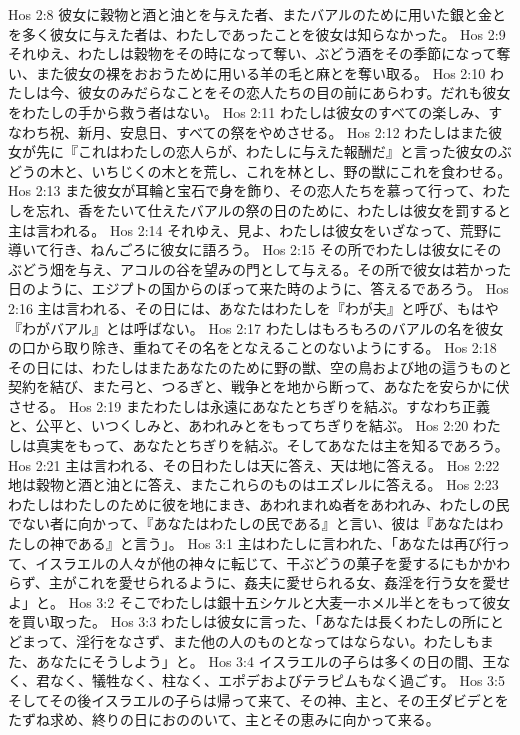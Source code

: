 Hos 2:8  彼女に穀物と酒と油とを与えた者、またバアルのために用いた銀と金とを多く彼女に与えた者は、わたしであったことを彼女は知らなかった。
Hos 2:9  それゆえ、わたしは穀物をその時になって奪い、ぶどう酒をその季節になって奪い、また彼女の裸をおおうために用いる羊の毛と麻とを奪い取る。
Hos 2:10  わたしは今、彼女のみだらなことをその恋人たちの目の前にあらわす。だれも彼女をわたしの手から救う者はない。
Hos 2:11  わたしは彼女のすべての楽しみ、すなわち祝、新月、安息日、すべての祭をやめさせる。
Hos 2:12  わたしはまた彼女が先に『これはわたしの恋人らが、わたしに与えた報酬だ』と言った彼女のぶどうの木と、いちじくの木とを荒し、これを林とし、野の獣にこれを食わせる。
Hos 2:13  また彼女が耳輪と宝石で身を飾り、その恋人たちを慕って行って、わたしを忘れ、香をたいて仕えたバアルの祭の日のために、わたしは彼女を罰すると主は言われる。
Hos 2:14  それゆえ、見よ、わたしは彼女をいざなって、荒野に導いて行き、ねんごろに彼女に語ろう。
Hos 2:15  その所でわたしは彼女にそのぶどう畑を与え、アコルの谷を望みの門として与える。その所で彼女は若かった日のように、エジプトの国からのぼって来た時のように、答えるであろう。
Hos 2:16  主は言われる、その日には、あなたはわたしを『わが夫』と呼び、もはや『わがバアル』とは呼ばない。
Hos 2:17  わたしはもろもろのバアルの名を彼女の口から取り除き、重ねてその名をとなえることのないようにする。
Hos 2:18  その日には、わたしはまたあなたのために野の獣、空の鳥および地の這うものと契約を結び、また弓と、つるぎと、戦争とを地から断って、あなたを安らかに伏させる。
Hos 2:19  またわたしは永遠にあなたとちぎりを結ぶ。すなわち正義と、公平と、いつくしみと、あわれみとをもってちぎりを結ぶ。
Hos 2:20  わたしは真実をもって、あなたとちぎりを結ぶ。そしてあなたは主を知るであろう。
Hos 2:21  主は言われる、その日わたしは天に答え、天は地に答える。
Hos 2:22  地は穀物と酒と油とに答え、またこれらのものはエズレルに答える。
Hos 2:23  わたしはわたしのために彼を地にまき、あわれまれぬ者をあわれみ、わたしの民でない者に向かって、『あなたはわたしの民である』と言い、彼は『あなたはわたしの神である』と言う」。
Hos 3:1  主はわたしに言われた、「あなたは再び行って、イスラエルの人々が他の神々に転じて、干ぶどうの菓子を愛するにもかかわらず、主がこれを愛せられるように、姦夫に愛せられる女、姦淫を行う女を愛せよ」と。
Hos 3:2  そこでわたしは銀十五シケルと大麦一ホメル半とをもって彼女を買い取った。
Hos 3:3  わたしは彼女に言った、「あなたは長くわたしの所にとどまって、淫行をなさず、また他の人のものとなってはならない。わたしもまた、あなたにそうしよう」と。
Hos 3:4  イスラエルの子らは多くの日の間、王なく、君なく、犠牲なく、柱なく、エポデおよびテラピムもなく過ごす。
Hos 3:5  そしてその後イスラエルの子らは帰って来て、その神、主と、その王ダビデとをたずね求め、終りの日におののいて、主とその恵みに向かって来る。
